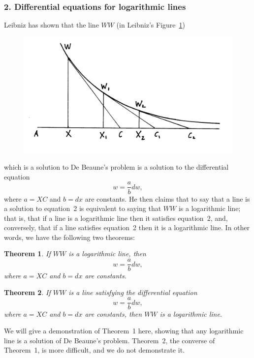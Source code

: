 \documentclass[twoside,openright]{article}
\newtheorem{theorem}{Theorem}
\begin{document}
\subsubsection*{2. Differential equations for logarithmic lines}

Leibniz has shown that the line $WW$ (in Leibniz's Figure~\ref{debeaune2})
\begin{figure}[htp]
\begin{center}
\includegraphics[width=.85\textwidth]{fig/Figure26A}
\caption{}
\label{debeaune2}
\vspace{-10pt}
\end{center}
\end{figure} 
which is a solution to De Beaune's problem is a solution to the differential equation
\begin{equation}
w = \frac{a}{b}dw,
\end{equation}
where $a = XC$ and $b= dx$ are constants.  He then claims that to say
that a line is a solution to equation~2 is equivalent to saying that
$WW$ is a logarithmic line; that is, that if a line is a logarithmic
line then it satisfies equation~2, and, conversely, that if a line
satisfies equation~2 then it is a logarithmic line.  In other words,
we have the following two theorems:

\begin{theorem}
If $WW$ is a logarithmic line, then
$$w= \frac{a}{b}dw,$$
where $a = XC$ and $b= dx$ are constants.
\end{theorem}

\begin{theorem}
If $WW$ is a line satisfying the differential equation
$$w=\frac{a}{b}dw,$$
where $a = XC$ and $b= dx$ are constants,
then $WW$ is a logarithmic line.
\end{theorem}

We will give a demonstration of Theorem~1 here, showing that any
logarithmic line is a solution of De Beaune's problem.  Theorem~2, the
converse of Theorem~1, is more difficult, and we do not demonstrate
it.  \vspace{\baselineskip}
\end{document}
